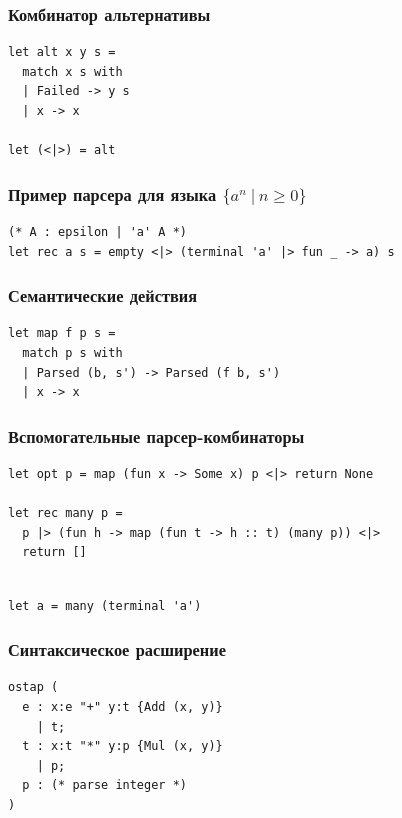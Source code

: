 \documentclass{beamer}
\begin{document}
\begin{frame}[fragile]
  \transwipe[direction=90]
  \frametitle{Комбинатор альтернативы}  
\begin{lstlisting}[frame=single]  
let alt x y s =
  match x s with
  | Failed -> y s
  | x -> x

let (<|>) = alt
\end{lstlisting}
\end{frame}


\begin{frame}[fragile]
  \transwipe[direction=90]
  \frametitle{Пример парсера для языка $\{ a^n \ | \ n \geq 0 \}$}  
\begin{lstlisting}[frame=single]  
(* A : epsilon | 'a' A *)
let rec a s = empty <|> (terminal 'a' |> fun _ -> a) s
\end{lstlisting}
\end{frame}


\begin{frame}[fragile]
  \transwipe[direction=90]
  \frametitle{Семантические действия}  
\begin{lstlisting}[frame=single]  
let map f p s = 
  match p s with
  | Parsed (b, s') -> Parsed (f b, s')
  | x -> x
\end{lstlisting}
\end{frame}

\begin{frame}[fragile]
  \transwipe[direction=90]
  \frametitle{Вспомогательные парсер-комбинаторы}  
\begin{lstlisting}[frame=single]  
let opt p = map (fun x -> Some x) p <|> return None
    
let rec many p =
  p |> (fun h -> map (fun t -> h :: t) (many p)) <|> 
  return []
    
\end{lstlisting}

\begin{lstlisting}[frame=single]  
let a = many (terminal 'a')
\end{lstlisting}
\end{frame}

\begin{frame}[fragile]
  \transwipe[direction=90]
  \frametitle{Синтаксическое расширение}  
\begin{lstlisting}[frame=single]  
ostap (
  e : x:e "+" y:t {Add (x, y)} 
    | t; 
  t : x:t "*" y:p {Mul (x, y)} 
    | p;
  p : (* parse integer *)
)
\end{lstlisting}
\end{frame}
\end{document}
